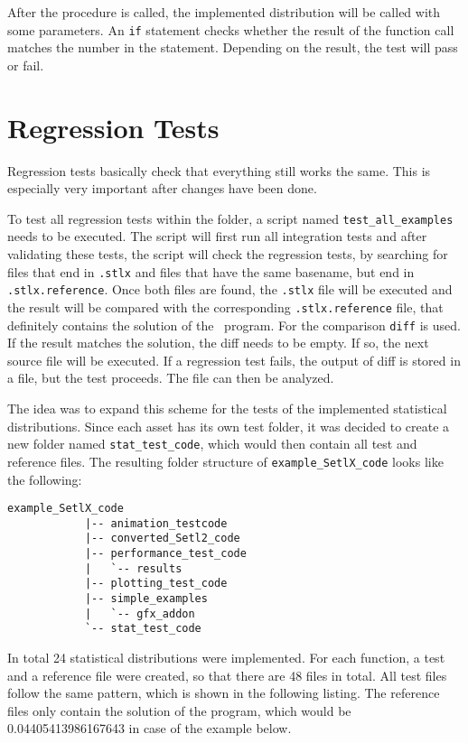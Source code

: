 	After the procedure is called, the implemented distribution will be called with some parameters. An \lstinline{if} statement checks whether the result of the function call matches the number in the statement. Depending on the result, the test will pass or fail.


\section{Regression Tests}

	Regression tests basically check that everything still works the same. This is especially very important after changes have been done.

	To test all regression tests within the folder, a script named \lstinline{test_all_examples} needs to be executed. The script will first run all integration tests and after validating these tests, the script will check the regression tests, by searching for files that end in \lstinline{.stlx} and files that have the same basename, but end in \lstinline{.stlx.reference}. Once both files are found, the \lstinline{.stlx} file will be executed and the result will be compared with the corresponding \lstinline{.stlx.reference} file, that definitely contains the solution of the \setlx\ program. For the comparison \lstinline{diff} is used. If the result matches the solution, the diff needs to be empty. If so, the next source file will be executed. If a regression test fails, the output of diff is stored in a file, but the test proceeds. The file can then be analyzed.

	The idea was to expand this scheme for the tests of the implemented statistical distributions. Since each asset has its own test folder, it was decided to create a new folder named \lstinline{stat_test_code}, which would then contain all test and reference files. The resulting folder structure of \lstinline{example_SetlX_code} looks like the following:
	
	\begin{center}
		\begin{lstlisting}[caption={Folder Structure \lstinline{example\_SetlX\_code}}, label={lis:regressionTests}]
			example_SetlX_code
			|-- animation_testcode
			|-- converted_Setl2_code
			|-- performance_test_code
			|   `-- results
			|-- plotting_test_code
			|-- simple_examples
			|   `-- gfx_addon
			`-- stat_test_code
		\end{lstlisting}
	\end{center}

	In total 24 statistical distributions were implemented. For each function, a test and a reference file were created, so that there are 48 files in total. All test files follow the same pattern, which is shown in the following listing. The reference files only contain the solution of the program, which would be 0.04405413986167643 in case of the example below.

